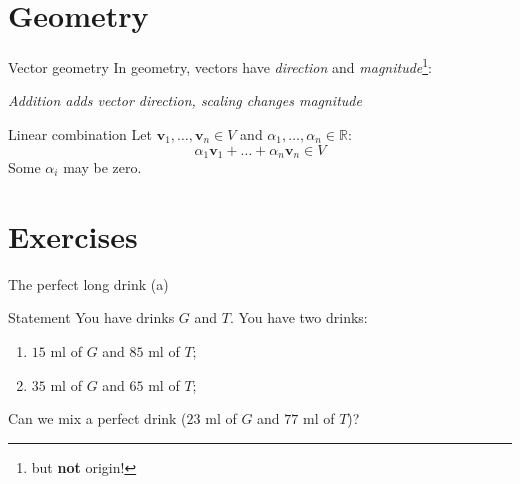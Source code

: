 \documentclass[10pt]{beamer}
\begin{document}
\section{Geometry}
\begin{frame}{Vector geometry}
    In geometry, vectors have \textit{direction} and \textit{magnitude}\footnote{but \textbf{not} origin!}:

    \begin{center}
        
        
        
        {\small{\textit{Addition adds vector direction, scaling changes magnitude}}}
    \end{center}
\end{frame}

\begin{frame}{Linear combination}
    Let $\mathbf{v}_1, \dots, \mathbf{v}_n \in V$ and $\alpha_1, \dots, \alpha_n \in \mathbb R$:
    $$
    \alpha_1 \mathbf{v}_1 + \dots+\alpha_n \mathbf{v}_n \in V
    $$
    Some $\alpha_i$ may be zero.
\end{frame}

\section{Exercises}
\begin{frame}{The perfect long drink (a)}
    \begin{block}{Statement}
    You have drinks $G$ and $T$. You have two drinks:
    \begin{enumerate}
        \item $15$ ml of $G$ and $85$ ml of $T$;
        \item $35$ ml of $G$ and $65$ ml of $T$;
    \end{enumerate}

    Can we mix a perfect drink ($23$ ml of $G$ and $77$ ml of $T$)?
    \end{block}
\end{frame}
\end{document}
